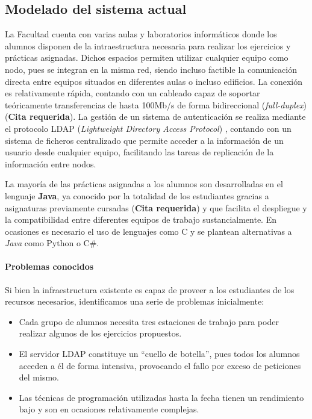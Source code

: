 \subsection{Modelado del sistema actual}

La Facultad cuenta con varias aulas y laboratorios informáticos donde los alumnos disponen de la intraestructura necesaria para realizar los ejercicios y prácticas asignadas. Dichos espacios permiten utilizar cualquier equipo como nodo, pues se integran en la misma red, siendo incluso factible la comunicación directa entre equipos situados en diferentes aulas o incluso edificios. La conexión es relativamente rápida, contando con un cableado capaz de soportar teóricamente transferencias de hasta 100Mb/s de forma bidireccional (\textit{full-duplex}) (\textbf{Cita requerida}). La gestión de un sistema de autenticación se realiza mediante el protocolo LDAP (\textit{Lightweight Directory Access Protocol}) \cite{RFC4516-comment}, contando con un sistema de ficheros centralizado que permite acceder a la información de un usuario desde cualquier equipo, facilitando las tareas de replicación de la información entre nodos.

La mayoría de las prácticas asignadas a los alumnos son desarrolladas en el lenguaje \textbf{Java}, ya conocido por la totalidad de los estudiantes gracias a asignaturas previamente cursadas (\textbf{Cita requerida}) y que facilita el despliegue y la compatibilidad entre diferentes equipos de trabajo sustancialmente. En ocasiones es necesario el uso de lenguajes como C y se plantean alternativas a \textit{Java} como Python o C\#.

\paragraph{Problemas conocidos}

Si bien la infraestructura existente es capaz de proveer a los estudiantes de los recursos necesarios, identificamos una serie de problemas inicialmente:

\begin{itemize}
  \item Cada grupo de alumnos necesita tres estaciones de trabajo para poder realizar algunos de los ejercicios propuestos.
  \item El servidor LDAP constituye un ``cuello de botella'', pues todos los alumnos acceden a él de forma intensiva, provocando el fallo por exceso de peticiones del mismo.
  \item Las técnicas de programación utilizadas hasta la fecha tienen un rendimiento bajo y son en ocasiones relativamente complejas.
\end{itemize}

